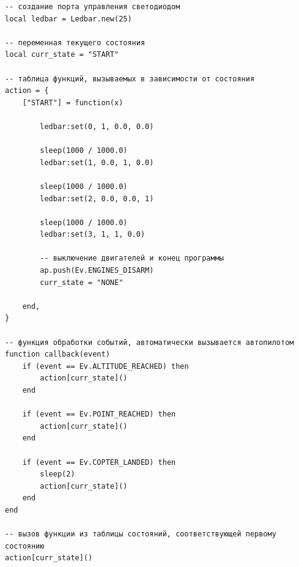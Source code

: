 \begin{verbatim}
-- создание порта управления светодиодом
local ledbar = Ledbar.new(25)

-- переменная текущего состояния
local curr_state = "START"

-- таблица функций, вызываемых в зависимости от состояния
action = {
	["START"] = function(x)

		ledbar:set(0, 1, 0.0, 0.0)

		sleep(1000 / 1000.0) 
		ledbar:set(1, 0.0, 1, 0.0)

		sleep(1000 / 1000.0) 
		ledbar:set(2, 0.0, 0.0, 1)

		sleep(1000 / 1000.0) 
		ledbar:set(3, 1, 1, 0.0)

		-- выключение двигателей и конец программы
		ap.push(Ev.ENGINES_DISARM)
		curr_state = "NONE"

	end,
}

-- функция обработки событий, автоматически вызывается автопилотом
function callback(event)
	if (event == Ev.ALTITUDE_REACHED) then
		action[curr_state]()
	end

	if (event == Ev.POINT_REACHED) then
		action[curr_state]()
	end

	if (event == Ev.COPTER_LANDED) then
		sleep(2)
		action[curr_state]()
	end
end

-- вызов функции из таблицы состояний, соответствующей первому состоянию
action[curr_state]()
\end{verbatim}

